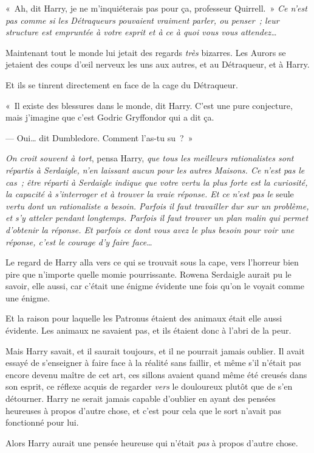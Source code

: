 «~Ah, dit Harry, je ne m'inquiéterais pas pour ça, professeur Quirrell.~» \emph{Ce n'est pas comme si les Détraqueurs pouvaient vraiment parler, ou penser~; leur structure est empruntée à votre esprit et à ce à quoi vous vous attendez…}

Maintenant tout le monde lui jetait des regards \emph{très} bizarres. Les Aurors se jetaient des coups d'œil nerveux les uns aux autres, et au Détraqueur, et à Harry.

Et ils se tinrent directement en face de la cage du Détraqueur.

«~Il existe des blessures dans le monde, dit Harry. C'est une pure conjecture, mais j'imagine que c'est Godric Gryffondor qui a dit ça.

--- Oui… dit Dumbledore. Comment l'as-tu su~?~»

\emph{On croit souvent à tort}, pensa Harry, \emph{que tous les meilleurs rationalistes sont répartis à Serdaigle, n'en laissant aucun pour les autres Maisons. Ce n'est pas le cas~; être réparti à Serdaigle indique que votre vertu la plus forte est la curiosité, la capacité à s'interroger et à trouver la vraie réponse. Et ce n'est pas le} seule \emph{vertu dont un rationaliste a besoin. Parfois il faut travailler dur sur un problème, et s'y atteler pendant longtemps. Parfois il faut trouver un plan malin qui permet d'obtenir la réponse. Et parfois ce dont vous avez le plus besoin pour voir une réponse, c'est le courage d'y faire face…}

Le regard de Harry alla vers ce qui se trouvait sous la cape, vers l'horreur bien pire que n'importe quelle momie pourrissante. Rowena Serdaigle aurait pu le savoir, elle aussi, car c'était une énigme évidente une fois qu'on le voyait comme une énigme.

Et la raison pour laquelle les Patronus étaient des animaux était elle aussi évidente. Les animaux ne savaient pas, et ils étaient donc à l'abri de la peur.

Mais Harry savait, et il saurait toujours, et il ne pourrait jamais oublier. Il avait essayé de s'enseigner à faire face à la réalité sans faillir, et même s'il n'était pas encore devenu maître de cet art, ces sillons avaient quand même été creusés dans son esprit, ce réflexe acquis de regarder \emph{vers} le douloureux plutôt que de s'en détourner. Harry ne serait jamais capable d'oublier en ayant des pensées heureuses à propos d'autre chose, et c'est pour cela que le sort n'avait pas fonctionné pour lui.

Alors Harry aurait une pensée heureuse qui n'était \emph{pas} à propos d'autre chose.


